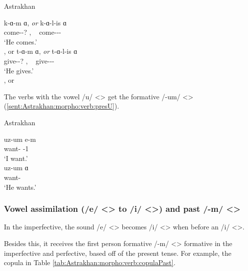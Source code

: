 \begin{exe}
	\ex Astrakhan \label{sent:Astrakhan:morpho:verb:presIndcKara}
	\begin{xlist}
		\ex \gll k-ɑ-m ɑ, \textit{or} k-ɑ-l-is ɑ \\
		come-{\thgloss}-? {\aux}, ~ come-{\thgloss}-{\infgloss}-{\impfcvb} {\aux} \\
		\trans `He comes.'\\
		, or 
		\ex \gll t-ɑ-m ɑ, \textit{or} t-ɑ-l-is ɑ \\
		give-{\thgloss}-? {\aux}, ~ give-{\thgloss}-{\infgloss}-{\impfcvb} {\aux} \\
		\trans `He gives.'\\
		, or  
	\end{xlist}
\end{exe}

The verbs with the vowel /u/ <> get the formative /-um/ <> (\ref{sent:Astrakhan:morpho:verb:presU}). 
\begin{exe}
	\ex Astrakhan \label{sent:Astrakhan:morpho:verb:presU}
	\begin{xlist}
		\ex \gll uz-um e-m \\
		want-{\impfcvb} {\aux}-1{\sg} \\
		\trans `I want.'\\
		\armenian{ուզում էմ} 
		\ex \gll uz-um ɑ \\
		want-{\impfcvb} {\aux} \\
		\trans `He wants.'\\
		\armenian{ուզում ա} 
	\end{xlist}
\end{exe}

\subsubsection{Vowel assimilation (/e/ <> to /i/ <>) and past /-m/ <>}

In the imperfective, the sound /e/ <> becomes /i/ <> when before an /i/ <>. 

Besides this, it receives the first person formative /-m/ <> formative in the imperfective and perfective, based off of the present tense. For example, the copula  in   Table \ref{tab:Astrakhan:morpho:verb:copulaPast}. 

